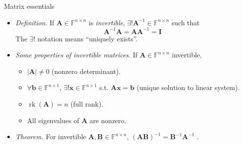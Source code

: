 \documentclass{beamer}
\numberwithin{equation}{section}
\begin{document}
\begin{frame}{Matrix essentials}
    \begin{itemize}
        \item
        \textit{Definition.} If $ \mathbf{A} \in \mathbb{F}^{n \times n} $ is
        \textit{invertible}, $ \exists! \mathbf{A}^{-1} \in
        \mathbb{F}^{n \times n} $ such that
        \begin{equation*}
            \mathbf{A}^{-1}\mathbf{A} = \mathbf{AA}^{-1} = \mathbf{I}
        \end{equation*}
        The $ \exists! $ notation means ``uniquely exists''.

        \item
        \textit{
            Some properties of invertible matrices\footnotemark{}.
        } If $ \mathbf{A} \in
        \mathbb{F}^{n \times n} $ invertible,
        \begin{itemize}
            \item
            $ |\mathbf{A}| \ne 0 $ (nonzero determinant).

            \item
            $ \forall \mathbf{b} \in \mathbb{F}^{n \times 1} $,
            $ \exists! \mathbf{x} \in \mathbb{F}^{n \times 1} $ s.t.
            $ \mathbf{Ax} = \mathbf{b} $ (unique solution to linear system).

            \item
            $ \operatorname{rk}(\mathbf{A}) = n $ (full rank).

            \item
            All eigenvalues of $ \mathbf{A} $ are nonzero.
        \end{itemize}

        \item
        \textit{Theorem.} For invertible $ \mathbf{A}, \mathbf{B} \in
        \mathbb{F}^{n \times n} $, $ (\mathbf{AB})^{-1} =
        \mathbf{B}^{-1}\mathbf{A}^{-1} $ \cite{jacob_linalg}.
    \end{itemize}

    \bigskip
\end{frame}
\end{document}
